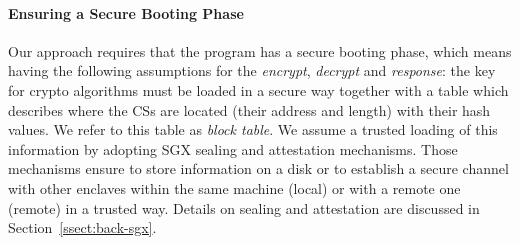 \paragraph{\textbf{Ensuring a Secure Booting Phase}}
Our approach requires that the program has a secure booting phase, which means 
having the following assumptions for the
\emph{encrypt}, \emph{decrypt} and \emph{response}: the key for crypto 
algorithms must be loaded in a secure way together with a table which describes 
where the CSs are located (\ie their address and length) with their hash values.
We refer to this table as \emph{block table}.
We assume a trusted loading of this information by adopting SGX sealing and 
attestation mechanisms.
Those mechanisms ensure to store information on a disk or to establish a secure 
channel with other enclaves within the same machine (\ie local) or with a 
remote one (\ie remote) in a trusted way.
Details on sealing and attestation are discussed in 
Section~\ref{ssect:back-sgx}.

